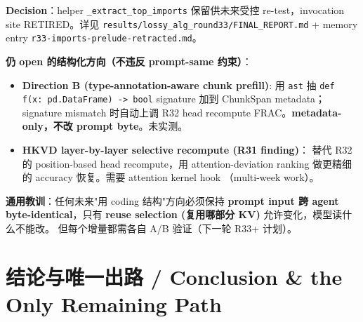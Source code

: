 \documentclass[11pt,a4paper]{article}
\begin{document}
\begin{itemize}
\textbf{Decision}：helper \texttt{\_extract\_top\_imports} 保留供未来受控
re-test，invocation site RETIRED。详见
\texttt{results/lossy\_alg\_round33/FINAL\_REPORT.md} + memory entry
\texttt{r33-imports-prelude-retracted.md}。

\textbf{仍 open 的结构化方向（不违反 prompt-same 约束）}：
\begin{itemize}
  \item \textbf{Direction B (type-annotation-aware chunk prefill)}: 用
        \texttt{ast} 抽 \texttt{def f(x: pd.DataFrame) -> bool} signature
        加到 ChunkSpan metadata；signature mismatch 时自动上调 R32 head
        recompute FRAC。\textbf{metadata-only，不改 prompt byte}。未实测。
  \item \textbf{HKVD layer-by-layer selective recompute (R31 finding)}：
        替代 R32 的 position-based head recompute，用 attention-deviation
        ranking 做更精细的 accuracy 恢复。需要 attention kernel hook
        （multi-week work）。
\end{itemize}

\textbf{通用教训}：任何未来"用 coding 结构"方向必须保持
\textbf{prompt input 跨 agent byte-identical}，只有
\textbf{reuse selection (复用哪部分 KV)} 允许变化，模型读什么不能改。
        但每个增量都需各自 A/B 验证（下一轮 R33+ 计划）。
\end{itemize}

\section{结论与唯一出路 / Conclusion \& the Only Remaining Path}
\end{document}
